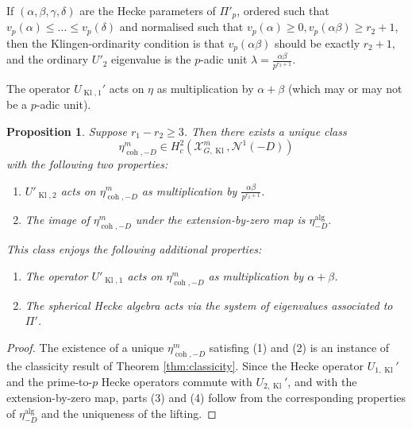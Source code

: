 \documentclass[cjm]{ipart}
\theoremstyle{plain}
\newtheorem{proposition}[theorem]{Proposition}
\theoremstyle{remark}
\DeclareMathOperator{\coh}{coh}
\DeclareMathOperator{\Kl}{Kl}
\newcommand{\cN}{\mathcal{N}}
\newcommand{\cX}{\mathcal{X}}
\numberwithin{equation}{subsection}
\renewcommand{\le}{\leqslant}
\renewcommand{\ge}{\geqslant}
\begin{document}
   \begin{remark}
    If $(\alpha, \beta, \gamma, \delta)$ are the Hecke parameters of $\Pi'_p$, ordered such that $v_p(\alpha) \le \dots \le v_p(\delta)$ and normalised such that $v_p(\alpha) \ge 0, v_p(\alpha \beta) \ge r_2 + 1$, then the Klingen-ordinarity condition is that $v_p(\alpha\beta)$ should be exactly $r_2 + 1$, and the ordinary $U'_2$ eigenvalue is the $p$-adic unit $\lambda = \frac{\alpha\beta}{p^{r_2 + 1}}$.
   \end{remark}

   \begin{note}
    The operator $U_{\Kl, 1}'$ acts on $\eta$ as multiplication by $\alpha + \beta$ (which may or may not be a $p$-adic unit).
   \end{note}

   \begin{proposition}
    \label{prop:etaproperties}
    Suppose $r_1 - r_2 \ge 3$. Then there exists a unique class \[\eta^m_{\coh,-D} \in H^2_c\left(\cX_{G,\Kl}^m, \cN^1(-D)\right)\] with the following two properties:
    \begin{enumerate}
     \item $U'_{\Kl, 2}$ acts on $\eta^m_{\coh,-D}$ as multiplication by  $\frac{\alpha\beta}{p^{r_2 + 1}}$.
     \item The image of $\eta^m_{\coh,-D}$ under the extension-by-zero map is $\eta^{\mathrm{alg}}_{-D}$.
    \end{enumerate}

    This class enjoys the following additional properties:
    \begin{enumerate}
     \item[(3)] The operator $U'_{\Kl, 1}$ acts on $\eta^m_{\coh,-D}$ as multiplication by $\alpha + \beta$.
     \item[(4)] The spherical Hecke algebra acts via the system of eigenvalues associated to $\Pi'$.
    \end{enumerate}
   \end{proposition}

   \begin{proof}
    The existence of a unique $\eta^m_{\coh,-D}$ satisfing (1) and (2) is an instance of the classicity result of Theorem \ref{thm:classicity}. Since the Hecke operator $U_{1, \Kl}'$ and the prime-to-$p$ Hecke operators commute with $U_{2, \Kl}'$, and with the extension-by-zero map, parts (3) and (4) follow from the corresponding properties of $\eta^{\mathrm{alg}}_{-D}$ and the uniqueness of the lifting.
   \end{proof}
\end{document}
